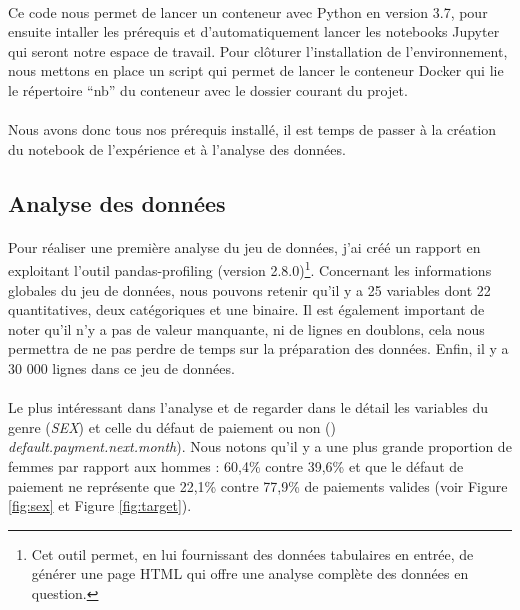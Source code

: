 \documentclass[10pt, french, a4paper]{report}
\begin{document}
\paragraph{}
Ce code nous permet de lancer un conteneur avec Python en version 3.7, pour ensuite intaller les prérequis et d'automatiquement lancer les notebooks Jupyter qui seront notre espace de travail. Pour clôturer l'installation de l'environnement, nous mettons en place un script qui permet de lancer le conteneur Docker qui lie le répertoire ``nb'' du conteneur avec le dossier courant du projet.

\paragraph{}
Nous avons donc tous nos prérequis installé, il est temps de passer à la création du notebook de l'expérience et à l'analyse des données.

\subsection{Analyse des données}

\paragraph{}
Pour réaliser une première analyse du jeu de données, j'ai créé un rapport en exploitant l'outil pandas-profiling (version 2.8.0)\footnote{Cet outil permet, en lui fournissant des données tabulaires en entrée, de générer une page HTML qui offre une analyse complète des données en question.}. Concernant les informations globales du jeu de données, nous pouvons retenir qu'il y a 25 variables dont 22 quantitatives, deux catégoriques et une binaire. Il est également important de noter qu'il n'y a pas de valeur manquante, ni de lignes en doublons, cela nous permettra de ne pas perdre de temps sur la préparation des données. Enfin, il y a 30 000 lignes dans ce jeu de données.

\paragraph{}
Le plus intéressant dans l'analyse et de regarder dans le détail les variables du genre (\textit{SEX}) et celle du défaut de paiement ou non ()\textit{	default.payment.next.month}). Nous notons qu'il y a une plus grande proportion de femmes par rapport aux hommes : 60,4\% contre 39,6\% et que le défaut de paiement ne représente que 22,1\% contre 77,9\% de paiements valides (voir Figure \ref{fig:sex} et Figure \ref{fig:target}).
\end{document}
